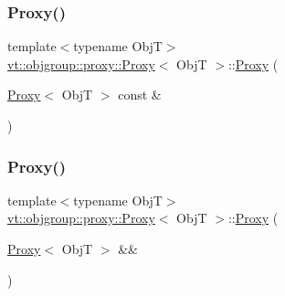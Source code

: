 \subsubsection{\texorpdfstring{Proxy()}{Proxy()}\hspace{0.1cm}{\footnotesize\ttfamily [2/4]}}
{\footnotesize\ttfamily template$<$typename ObjT$>$ \\
\hyperlink{structvt_1_1objgroup_1_1proxy_1_1_proxy}{vt\+::objgroup\+::proxy\+::\+Proxy}$<$ ObjT $>$\+::\hyperlink{structvt_1_1objgroup_1_1proxy_1_1_proxy}{Proxy} (\begin{DoxyParamCaption}\item[{\hyperlink{structvt_1_1objgroup_1_1proxy_1_1_proxy}{Proxy}$<$ ObjT $>$ const \&}]{ }\end{DoxyParamCaption})\hspace{0.3cm}{\ttfamily [default]}}

\mbox{\label{structvt_1_1objgroup_1_1proxy_1_1_proxy_a8711a58bb0444c24553527b6ed9d0cfb}} 
\subsubsection{\texorpdfstring{Proxy()}{Proxy()}\hspace{0.1cm}{\footnotesize\ttfamily [3/4]}}
{\footnotesize\ttfamily template$<$typename ObjT$>$ \\
\hyperlink{structvt_1_1objgroup_1_1proxy_1_1_proxy}{vt\+::objgroup\+::proxy\+::\+Proxy}$<$ ObjT $>$\+::\hyperlink{structvt_1_1objgroup_1_1proxy_1_1_proxy}{Proxy} (\begin{DoxyParamCaption}\item[{\hyperlink{structvt_1_1objgroup_1_1proxy_1_1_proxy}{Proxy}$<$ ObjT $>$ \&\&}]{ }\end{DoxyParamCaption})\hspace{0.3cm}{\ttfamily [default]}}

\mbox{\label{structvt_1_1objgroup_1_1proxy_1_1_proxy_ab76d59446c73ebf1cea9c80fd70fbd6b}} 
